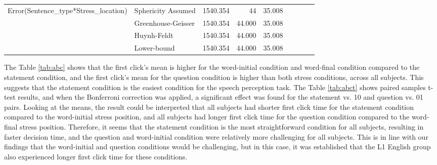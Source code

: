 \documentclass[a4paper]{article}
\begin{document}
\begin{table}[H]
\begin{tabular}{p{}p{}|l|r|r|r|r|r|}
\hline
\multirow{4}{*}{Error(Sentence\_type*Stress\_location)} & Sphericity Assumed & 1540.354                                     & 44                      & 35.008                           & \multicolumn{1}{l|}{~} & \multicolumn{1}{l|}{~}     \\ 
\cline{2-7}
                                                        & Greenhouse-Geisser & 1540.354                                     & 44.000                  & 35.008                           & \multicolumn{1}{l|}{~} & \multicolumn{1}{l|}{~}     \\ 
\cline{2-7}
                                                        & Huynh-Feldt        & 1540.354                                     & 44.000                  & 35.008                           & \multicolumn{1}{l|}{~} & \multicolumn{1}{l|}{~}     \\ 
\cline{2-7}
                                                        & Lower-bound        & 1540.354                                     & 44.000                  & 35.008                           & \multicolumn{1}{l|}{~} & \multicolumn{1}{l|}{~}     \\
\hline
\end{tabular}
\end{table}

The Table \ref{tab:abc} shows that the first click's mean is higher for the word-initial condition and word-final condition compared to the statement condition, and the first click's mean for the question condition is higher than both stress conditions, across all subjects. This suggests that the statement condition is the easiest condition for the speech perception task. The Table \ref{tab:abct} shows paired samples t-test results, and when the Bonferroni correction was applied, a significant effect was found for the statement vs. 10 and question vs. 01 pairs. Looking at the means, the result could be interpreted that all subjects had shorter first click time for the statement condition compared to the word-initial stress position, and all subjects had longer first click time for the question condition compared to the word-final stress position. Therefore, it seems that the statement condition is the most straightforward condition for all subjects, resulting in faster decision time, and the question and word-initial condition were relatively more challenging for all subjects. This is in line with our findings that the word-initial and question conditions would be challenging, but in this case, it was established that the L1 English group also experienced longer first click time for these conditions.
\end{document}
